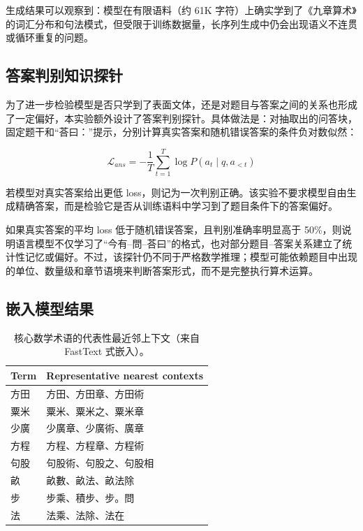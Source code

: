 \documentclass[UTF8,a4paper,twocolumn]{ctexart}
\begin{document}

生成结果可以观察到：模型在有限语料（约 61K 字符）上确实学到了《九章算术》的词汇分布和句法模式，但受限于训练数据量，长序列生成中仍会出现语义不连贯或循环重复的问题。

\subsection{答案判别知识探针}

为了进一步检验模型是否只学到了表面文体，还是对题目与答案之间的关系也形成了一定偏好，本实验额外设计了答案判别探针。具体做法是：对抽取出的问答块，固定题干和“荅曰：”提示，分别计算真实答案和随机错误答案的条件负对数似然：

\[
\mathcal{L}_{ans} = -\frac{1}{T}\sum_{t=1}^{T}\log P(a_t \mid q, a_{<t})
\]

若模型对真实答案给出更低 loss，则记为一次判别正确。该实验不要求模型自由生成精确答案，而是检验它是否从训练语料中学习到了题目条件下的答案偏好。


如果真实答案的平均 loss 低于随机错误答案，且判别准确率明显高于 50\%，则说明语言模型不仅学习了“今有--問--荅曰”的格式，也对部分题目--答案关系建立了统计性记忆或偏好。不过，该探针仍不同于严格数学推理；模型可能依赖题目中出现的单位、数量级和章节语境来判断答案形式，而不是完整执行算术运算。

\subsection{嵌入模型结果}

\begin{table}[!ht]
\centering
\scriptsize
\begin{tabular}{ll}
\toprule
Term & Representative nearest contexts \\
\midrule
方田 & 方田、方田章、方田術 \\
粟米 & 粟米、粟米之、粟米章 \\
少廣 & 少廣章、少廣術、廣章 \\
方程 & 方程、方程章、方程術 \\
句股 & 句股術、句股之、句股相 \\
畝 & 畝數、畝法、畝法除 \\
步 & 步乘、積步、步。問 \\
法 & 法乘、法除、法在 \\
\bottomrule
\end{tabular}
\caption{核心数学术语的代表性最近邻上下文（来自 FastText 式嵌入）。}
\end{table}
\end{document}
